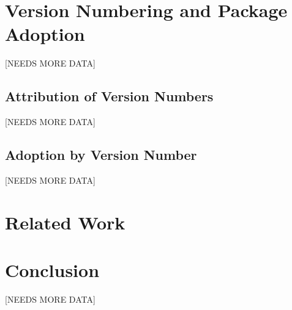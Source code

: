 \documentclass[10pt,conference]{IEEEtran}
\begin{document}
\section{Version Numbering and Package Adoption}
[NEEDS MORE DATA]

\subsection{Attribution of Version Numbers}
[NEEDS MORE DATA]

\subsection{Adoption by Version Number}
[NEEDS MORE DATA]

\section{Related Work}

\section{Conclusion}
[NEEDS MORE DATA]
\end{document}
